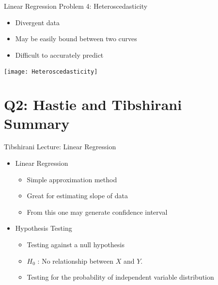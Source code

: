 \documentclass{beamer}
\begin{document}
\begin{frame}{Linear Regression Problem 4: Heteroscedasticity}
	\begin{itemize}
		\item Divergent data
		\item May be easily bound between two curves
		\item Difficult to accurately predict 
	\end{itemize}
	\centering
	\texttt{[image: Heteroscedasticity]}
\end{frame}

\section[Q2]{Q2: Hastie and Tibshirani Summary}

\begin{frame}{Tibshirani Lecture: Linear Regression}
	\begin{itemize}
		\item<1-> Linear Regression
		\begin{itemize}
			\item<1-> Simple approximation method
			\item<1-> Great for estimating slope of data
			\item<1-> From this one may generate confidence interval
		\end{itemize}
		\item<2> Hypothesis Testing
		\begin{itemize}
			\item<2> Testing against a null hypothesis
			\item<2>[] $H_0$ : No relationship between $X$ and $Y$.
			\item<2> Testing for the probability of independent variable distribution 
		\end{itemize}
	\end{itemize}
\end{frame}
\end{document}
